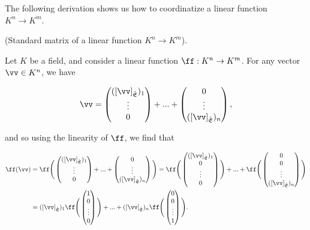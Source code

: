 The following derivation shows us how to coordinatize a linear function $K^n \rightarrow K^m$.

\begin{deriv}
\label{ch::lin_alg::deriv::standard_matrix}
    (Standard matrix of a linear function $K^n \rightarrow K^m$). 
    
    Let $K$ be a field, and consider a linear function $\ff:K^n \rightarrow K^m$. For any vector $\vv \in K^n$, we have 
    
    \begin{align*}
        \vv =
        \begin{pmatrix} ([\vv]_\sE)_1 \\ \vdots \\ 0 \end{pmatrix} + ... + \begin{pmatrix} 0 \\ \vdots \\ ([\vv]_\sE)_n \end{pmatrix},
    \end{align*}
    
    and so using the linearity of $\ff$, we find that
    
    \begin{align*}
        \ff(\vv) &= 
        \ff
        \Bigg(
            \begin{pmatrix} ([\vv]_\sE)_1 \\ \vdots \\ 0 \end{pmatrix} + ... + \begin{pmatrix} 0 \\ \vdots \\ ([\vv]_\sE)_n \end{pmatrix}
        \Bigg)
        =
        \ff \Bigg( 
        \begin{pmatrix} 
                ([\vv]_\sE)_1 \\ 0 \\ \vdots \\ 0 
        \end{pmatrix} \Bigg)
        +
        ...
        +
        \ff \Bigg(
        \begin{pmatrix} 
                0 \\ 0 \\ \vdots \\ ([\vv]_\sE)_n 
        \end{pmatrix} \Bigg) \\
        &=
        ([\vv]_\sE)_1
        \ff \Bigg(
        \begin{pmatrix} 
                1 \\ 0 \\ \vdots \\ 0 
        \end{pmatrix} \Bigg)
        +
        ...
        +
        ([\vv]_\sE)_n
        \ff \Bigg(
        \begin{pmatrix} 
                0 \\ 0 \\ \vdots \\ 1 
        \end{pmatrix} \Bigg).
    \end{align*}
    

\end{deriv}
